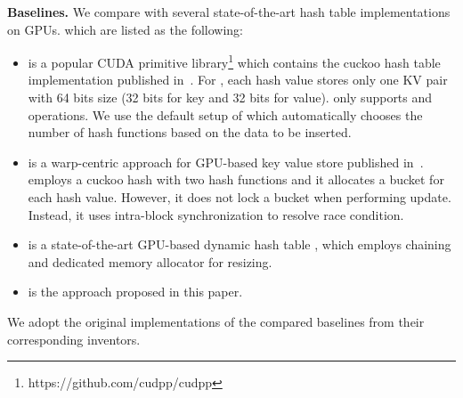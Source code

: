\vspace{1mm}\noindent\textbf{Baselines.} We compare \voter with several state-of-the-art hash table implementations on GPUs. which are listed as the following:
\begin{itemize}
	\item \cudpp is a popular CUDA primitive library\footnote{https://github.com/cudpp/cudpp} which contains the cuckoo hash table implementation published in~\cite{alcantara2009real}. 
	For \cudpp, each hash value stores only one KV pair with 64 bits size (32 bits for key and 32 bits for value). 
	\cudpp only supports  and  operations. We use the default setup of \cudpp which automatically chooses the number of hash functions based on the data to be inserted.
	\item \megakv is a warp-centric approach for GPU-based key value store published in~\cite{zhang2015mega}. \megakv employs a cuckoo hash with two hash functions and
	it allocates a bucket for each hash value. However, it does not lock a bucket when performing update. Instead, it uses intra-block synchronization to resolve race condition. 
	\item \slab is a state-of-the-art GPU-based dynamic hash table \cite{ashkiani2018dynamic}, which employs chaining and dedicated memory allocator for resizing.
	\item \voter is the approach proposed in this paper.
\end{itemize}
We adopt the original implementations of the compared baselines from their corresponding inventors. 



